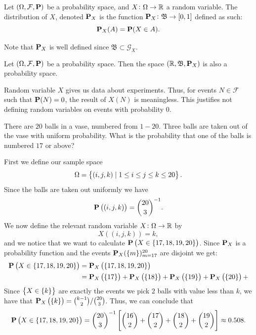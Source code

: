 \documentclass[11pt,a4paper]{article}
\begin{document}
\begin{definition}
  Let $(\Omega, \mathcal F, \mathbf{P})$ be a probability space, and 
  $X \colon \Omega \to \mathbb{R}$ a random variable.
  The distribution of $X$, denoted $\mathbf{P}_X$ is the function 
  $\mathbf{P}_X \colon \mathfrak B \to [0,1]$ defined as such:
  \[
    \mathbf{P}_X(A) = \mathbf{P}(X \in A).
  \]
\end{definition}
\begin{remark}
  Note that $\mathbf{P}_X$ is well defined since $\mathfrak B \subset \mathcal G_X$.
\end{remark}
\begin{remark}
  Let $(\Omega,\mathcal F,\mathbf{P})$ be a probability space.
  Then the space $(\mathbb{R}, \mathfrak B, \mathbf{P}_X)$ is also a probability space.
\end{remark}
\begin{remark}
  Random variable $X$ gives us data about experiments.
  Thus, for events $N \in \mathcal F$ such that $\mathbf{P}(N) = 0$,
  the result of $X(N)$ is meaningless.
  This justifies not defining random variables on events with probability $0$.
\end{remark}

\begin{exercise}
  There are $20$ balls in a vase, numbered from $1-20$.
  Three balls are taken out of the vase with uniform probability.
  What is the probability that one of the balls is numbered $17$ or above?
\end{exercise}
\begin{solution}
  First we define our sample space
  \[
    \Omega = \left\{(i,j,k) \mid 1 \le i \le j \le k \le 20\right\}.
  \]
  Since the balls are taken out uniformly we have 
  \[ \mathbf{P}\left((i,j,k)\right) = {\binom{20}{3}}^{-1}. \]
  We now define the relevant random variable $X \colon \Omega \to \mathbb{R}$ by
  \[
    X\left((i,j,k)\right) = k,
  \]
  and we notice that we want to calculate 
  $\mathbf{P}\left(X \in \{17,18,19,20\}\right)$.
  Since $\mathbf{P}_X$ is a probability function
  and the events $\mathbf{P}_X(\left\{m\right\})_{m=17}^{20}$ are disjoint
  we get:
  \begin{align*}
    \mathbf{P}\left(X \in \{17,18,19,20\}\right) &= 
    \mathbf{P}_X\left(\{17,18,19,20\}\right) \\ &=
    \mathbf{P}_X\left(\{17\}\right) + 
    \mathbf{P}_X\left(\{18\}\right) +
    \mathbf{P}_X\left(\{19\}\right) +
    \mathbf{P}_X\left(\{20\}\right) +
  \end{align*}
  Since $\left\{X \in \left\{k\right\}\right\}$ are exactly the events we pick $2$ balls with
  value less than $k$, we have that
  $\mathbf{P}_X\left(\{k\}\right) = \binom{k-1}{2}/\binom{20}{3}$.
  Thus, we can conclude that
  \[
    \mathbf{P}\left(X \in \{17,18,19,20\}\right) = 
    {\binom{20}{3}}^{-1} 
    \left[
      \binom{16}{2} + \binom{17}{2} + \binom{18}{2} + \binom{19}{2}
    \right]
    \approx 0.508.
  \]
\end{solution}
\end{document}
